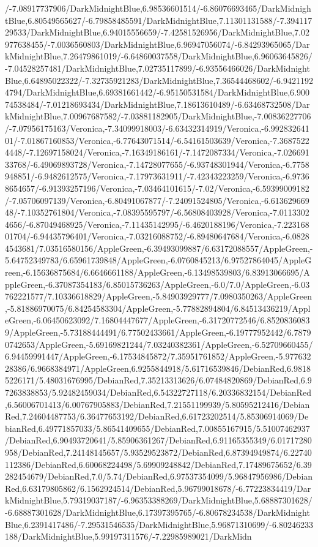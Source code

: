 {\begin{tikzternal}
/-7.08917737906/DarkMidnightBlue,6.98536601514/-6.86076693465/DarkMidnightBlue,6.80549565627/-6.79858485591/DarkMidnightBlue,7.11301131588/-7.39411729533/DarkMidnightBlue,6.94015556659/-7.42581526956/DarkMidnightBlue,7.02977638455/-7.0036560803/DarkMidnightBlue,6.96947056074/-6.84293965065/DarkMidnightBlue,7.26479861019/-6.64860037558/DarkMidnightBlue,6.96063645826/-7.04528257481/DarkMidnightBlue,7.02735117899/-6.93556466026/DarkMidnightBlue,6.64895022322/-7.32735921283/DarkMidnightBlue,7.36544468602/-6.94211924794/DarkMidnightBlue,6.69381661442/-6.95150531584/DarkMidnightBlue,6.90074538484/-7.01218693434/DarkMidnightBlue,7.18613610489/-6.63468732508/DarkMidnightBlue,7.00967687582/-7.03881182905/DarkMidnightBlue,-7.00836227706/-7.07956175163/Veronica,-7.34099918003/-6.63432314919/Veronica,-6.99283264101/-7.01867160853/Veronica,-6.77643071514/-6.54161503639/Veronica,-7.36875224448/-7.12697158024/Veronica,-7.16349186161/-7.1472087334/Veronica,-7.02669133768/-6.49069893728/Veronica,-7.14728077655/-6.93748301944/Veronica,-6.7758948851/-6.9482612575/Veronica,-7.17973631911/-7.42343223259/Veronica,-6.97368654657/-6.91393257196/Veronica,-7.03464101615/-7.02/Veronica,-6.59399009182/-7.05706097139/Veronica,-6.80491067877/-7.24091524805/Veronica,-6.61362966948/-7.10352761804/Veronica,-7.08395595797/-6.56808403928/Veronica,-7.01133024656/-6.87049468925/Veronica,-7.11435142995/-6.4620188196/Veronica,-7.22316801704/-6.94435796401/Veronica,-7.03216088752/-6.89480647684/Veronica,-6.08284543681/7.03516580156/AppleGreen,-6.39493099887/6.63172088557/AppleGreen,-5.64752349783/6.65961739848/AppleGreen,-6.0760845213/6.97527864045/AppleGreen,-6.15636875684/6.6646661188/AppleGreen,-6.13498539803/6.83913066695/AppleGreen,-6.37087354183/6.85015736263/AppleGreen,-6.0/7.0/AppleGreen,-6.03762221577/7.10336618829/AppleGreen,-5.84903929777/7.0980350263/AppleGreen,-5.81886970075/6.84254583304/AppleGreen,-5.77882894804/6.84513436219/AppleGreen,-6.06450623092/7.16804447677/AppleGreen,-6.31720772546/6.85208360839/AppleGreen,-5.73188444491/6.77502433661/AppleGreen,-6.19777952442/6.78790742653/AppleGreen,-5.69169821244/7.03240382361/AppleGreen,-6.52709660455/6.94459991447/AppleGreen,-6.17534845872/7.35951761852/AppleGreen,-5.97763228386/6.9668384971/AppleGreen,6.9255844918/5.61716539846/DebianRed,6.98185226171/5.48031676995/DebianRed,7.35213313626/6.07484820869/DebianRed,6.97263838853/5.92482459034/DebianRed,6.54322727118/6.20336832154/DebianRed,6.56006701413/6.00767905883/DebianRed,7.21551199939/5.80595212416/DebianRed,7.24604487753/6.36477653192/DebianRed,6.61723202514/5.85306914069/DebianRed,6.49771857033/5.86541409655/DebianRed,7.00855167915/5.51007462937/DebianRed,6.90493720641/5.85906361267/DebianRed,6.91165355349/6.01717280958/DebianRed,7.24148145657/5.93529523872/DebianRed,6.87394949874/6.22740112386/DebianRed,6.60068224498/5.69909248842/DebianRed,7.17489675652/6.39282454679/DebianRed,7.0/5.74/DebianRed,6.97537354099/5.96847956986/DebianRed,6.63179805862/6.1562924514/DebianRed,5.96799018678/-6.77223834419/DarkMidnightBlue,5.79319037187/-6.96353388269/DarkMidnightBlue,5.68887301628/-6.68887301628/DarkMidnightBlue,6.17397395765/-6.80678234538/DarkMidnightBlue,6.2391417486/-7.29531546535/DarkMidnightBlue,5.96871310699/-6.80246233188/DarkMidnightBlue,5.99197311576/-7.22985989021/DarkMidn
\end{tikzternal}}
